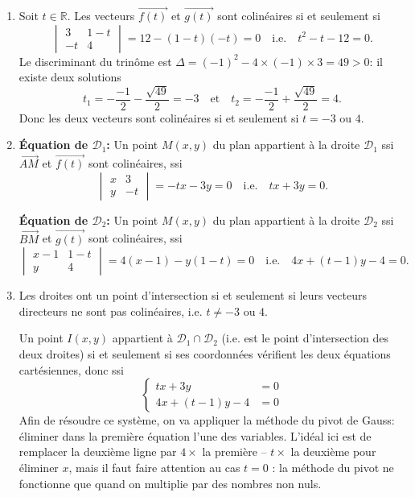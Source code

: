 \documentclass{article}
\theoremstyle{definition}
\newcommand{\R}{\mathbb R}
\begin{document}
\begin{enumerate}[label=\arabic*., listparindent=1.5em, labelsep=2em, itemindent=1.5em]
	\item Soit $t\in\R$. Les vecteurs $\overrightarrow{f(t)}$ et $\overrightarrow{g(t)}$ sont colinéaires si et seulement si
	\begin{equation*}
	\begin{vmatrix}
	3 & 1-t \\ -t & 4
	\end{vmatrix} = 12 -(1-t)(-t) = 0
	\quad\text{i.e.}\quad\boxed{
    t^2-t-12 = 0.}
    \end{equation*}
    Le discriminant du trinôme est $\Delta = (-1)^2-4\times(-1)\times 3 = 49 > 0$: il existe deux solutions
    \[
    t_1 = -\frac{-1}{2} - \frac{\sqrt{49}}{2} = -3\quad\text{et}\quad
    t_2 = -\frac{-1}{2} + \frac{\sqrt{49}}{2} = 4.
    \]
    Donc les deux vecteurs sont colinéaires si et seulement si $\boxed{t=-3\textrm{ ou }4.}$
    
	\item 
\textbf{Équation de $\boldsymbol{\mathcal{D}}_1$:} Un point $M(x,y)$ du plan appartient à la droite $\mathcal{D}_1$ ssi $\overrightarrow{AM}$ et $\overrightarrow{f(t)}$ sont colinéaires, ssi
	\[
    \begin{vmatrix}
    x & 3 \\ y & -t
    \end{vmatrix} = -tx-3y = 0\quad\text{i.e.}\quad
    \boxed{tx+3y=0.}
    \]\par
\textbf{Équation de $\boldsymbol{\mathcal{D}}_2$:} Un point $M(x,y)$ du plan appartient à la droite $\mathcal{D}_2$ ssi $\overrightarrow{BM}$ et $\overrightarrow{g(t)}$ sont colinéaires, ssi
	\[
    \begin{vmatrix}
    x-1 & 1-t \\ y & 4
    \end{vmatrix} = 4(x-1) - y(1-t) = 0\quad
    \textrm{i.e.}\quad
    \boxed{4x +(t-1)y - 4 = 0.}
    \]
    
	\item Les droites ont un point d'intersection si et seulement si leurs vecteurs directeurs ne sont pas colinéaires, i.e. $t\neq -3$ ou $4$.\par
	Un point $I(x,y)$ appartient à $\mathcal{D}_1\cap\mathcal{D}_2$ (i.e. est le point d'intersection des deux droites) si et seulement si ses coordonnées vérifient les deux équations cartésiennes, donc ssi
	\[\left\{
    \begin{array}{lc}
    tx + 3y &= 0\\
    4x + (t-1)y - 4 &= 0
    \end{array}\right.
    \]
Afin de résoudre ce système, on va appliquer la méthode du pivot de Gauss: éliminer dans la première équation l'une des variables. L'idéal ici est de remplacer la deuxième ligne par $4\times$ la première -- $t\times$ la deuxième pour éliminer $x$, mais il faut faire attention au cas $t=0$ : la méthode du pivot ne fonctionne que quand on multiplie par des nombres non nuls.


\end{enumerate}
\end{document}
